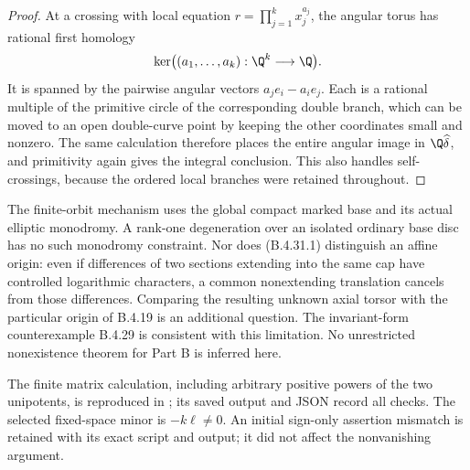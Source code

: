 \begin{proof}
At a crossing with local equation
$r=\prod_{j=1}^k x_j^{a_j}$, the angular torus has
rational first homology
\[
 \ker\bigl((a_1,\ldots,a_k):\Q^k\longrightarrow\Q\bigr).
\]
It is spanned by the pairwise angular vectors
$a_j e_i-a_i e_j$. Each is a rational multiple of the
primitive circle of the corresponding double branch,
which can be moved to an open double-curve point by
keeping the other coordinates small and nonzero.
The same calculation therefore places the entire angular
image in $\Q\widehat\delta$, and primitivity again gives
the integral conclusion. This also handles self-crossings,
because the ordered local branches were retained throughout.
\end{proof}

\begin{remark}
The finite-orbit mechanism uses the global compact marked
base and its actual elliptic monodromy. A rank-one degeneration
over an isolated ordinary base disc has no such monodromy
constraint. Nor does (B.4.31.1) distinguish an affine origin:
even if differences of two sections extending into the same
cap have controlled logarithmic characters, a common
nonextending translation cancels from those differences.
Comparing the resulting unknown axial torsor with the
particular origin of B.4.19 is an additional question.
The invariant-form counterexample B.4.29 is consistent with
this limitation. No unrestricted nonexistence theorem for
Part B is inferred here.
\end{remark}

The finite matrix calculation, including arbitrary positive
powers of the two unipotents, is reproduced in
; its saved output and
JSON record all checks. The selected fixed-space minor is
$-k\ell\ne0$. An initial sign-only assertion mismatch is
retained with its exact script and output; it did not affect
the nonvanishing argument.
